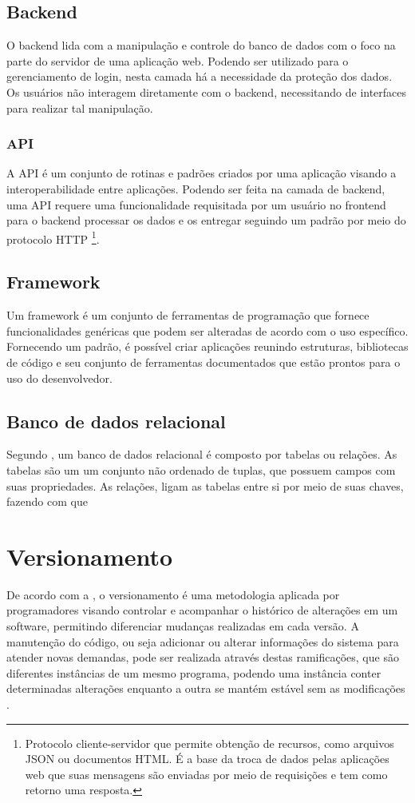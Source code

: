 \subsection{Backend}
O backend lida com a manipulação e controle do banco de dados com o foco na parte do servidor de uma aplicação web. Podendo ser utilizado para o gerenciamento de login, nesta camada há a necessidade da proteção dos dados. Os usuários não interagem diretamente com o backend, necessitando de interfaces para realizar tal manipulação.\cite{SOUTO}

\subsubsection{API}
A API é um conjunto de rotinas e padrões criados por uma aplicação visando a interoperabilidade entre aplicações. Podendo ser feita na camada de backend, uma API requere uma funcionalidade requisitada por um usuário no frontend para o backend processar os dados e os entregar seguindo um padrão por meio do protocolo HTTP
\footnote{Protocolo cliente-servidor que permite obtenção de recursos, como arquivos JSON ou documentos HTML. É a base da troca de dados pelas aplicações web que suas mensagens são enviadas por meio de requisições e tem como retorno uma resposta.\cite{HTTP} }\cite{BEECODE}.

\subsection{Framework}
Um framework é um conjunto de ferramentas de programação que fornece funcionalidades genéricas que podem ser alteradas de acordo com o uso específico. Fornecendo um padrão, é possível criar aplicações reunindo estruturas, bibliotecas de código e seu conjunto de ferramentas documentados que estão prontos para o uso do desenvolvedor.

\subsection{Banco de dados relacional}
Segundo , um banco de dados relacional é composto por tabelas ou relações. As tabelas são um um conjunto não ordenado de tuplas, que possuem campos com suas propriedades. As relações, ligam as tabelas entre si por meio de suas chaves, fazendo com que 
\section{Versionamento}
De acordo com a , o versionamento é uma metodologia aplicada por programadores visando controlar e acompanhar o histórico de alterações em um software, permitindo diferenciar mudanças realizadas em cada versão. A manutenção do código, ou seja adicionar ou alterar informações do sistema para atender novas demandas, pode ser realizada através destas ramificações, que são diferentes instâncias de um mesmo programa, podendo uma instância conter determinadas alterações enquanto a outra se mantém estável sem as modificações \cite{SOMOSTERA}.